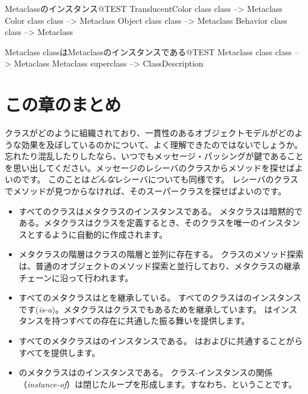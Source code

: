\documentclass[a4paper,10pt,twoside]{book}
\begin{document}
\begin{example}{Metaclassのインスタンス}{@TEST}
TranslucentColor class class --> Metaclass
Color class class                   --> Metaclass
Object class class                 --> Metaclass
Behavior class class              --> Metaclass
\end{example}
\begin{example}{Metaclass classはMetaclassのインスタンスである}{@TEST}
Metaclass class class --> Metaclass
Metaclass superclass --> ClassDescription
\end{example}

\section{この章のまとめ}
クラスがどのように組織されており、一貫性のあるオブジェクトモデルがどのような効果を及ぼしているのかについて、よく理解できたのではないでしょうか。忘れたり混乱したりしたなら、いつでもメッセージ・パッシングが鍵であることを思い出してください。メッセージのレシーバのクラスからメソッドを探せばよいのです。
このことは\emph{どんな}レシーバについても同様です。
レシーバのクラスでメソッドが見つからなければ、そのスーパークラスを探せばよいのです。

\begin{itemize}
\item すべてのクラスはメタクラスのインスタンスである。
	メタクラスは暗黙的である。メタクラスはクラスを定義するとき、そのクラスを唯一のインスタンスとするように自動的に作成されます。

\item メタクラスの階層はクラスの階層と並列に存在する。
	クラスのメソッド探索は、普通のオブジェクトのメソッド探索と並行しており、メタクラスの継承チェーンに沿って行われます。

\item すべてのメタクラスはとを継承している。
	すべてのクラスはのインスタンスです(\emph{is-a})。メタクラスはクラスでもあるためを継承しています。
	はインスタンスを持つすべての存在に共通した振る舞いを提供します。

\item すべてのメタクラスはのインスタンスである。
	はおよびに共通することがらすべてを提供します。

\item {}のメタクラスはのインスタンスである。
	クラス-インスタンスの関係（\emph{instance-of}）は閉じたループを形成します。すなわち、ということです。
\end{itemize}
\ifx\wholebook\relax\else
\end{document}
